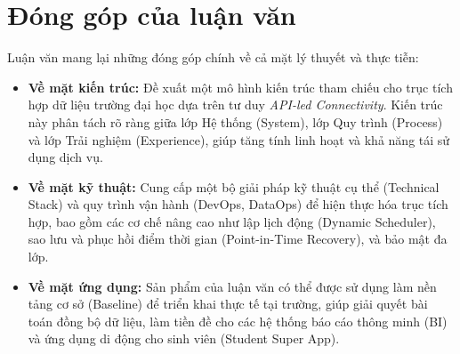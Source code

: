 \section{Đóng góp của luận văn}

Luận văn mang lại những đóng góp chính về cả mặt lý thuyết và thực tiễn:

\begin{itemize}
    \item \textbf{Về mặt kiến trúc:} Đề xuất một mô hình kiến trúc tham chiếu cho trục tích hợp dữ liệu trường đại học dựa trên tư duy \textit{API-led Connectivity}. Kiến trúc này phân tách rõ ràng giữa lớp Hệ thống (System), lớp Quy trình (Process) và lớp Trải nghiệm (Experience), giúp tăng tính linh hoạt và khả năng tái sử dụng dịch vụ.
    \item \textbf{Về mặt kỹ thuật:} Cung cấp một bộ giải pháp kỹ thuật cụ thể (Technical Stack) và quy trình vận hành (DevOps, DataOps) để hiện thực hóa trục tích hợp, bao gồm các cơ chế nâng cao như lập lịch động (Dynamic Scheduler), sao lưu và phục hồi điểm thời gian (Point-in-Time Recovery), và bảo mật đa lớp.
    \item \textbf{Về mặt ứng dụng:} Sản phẩm của luận văn có thể được sử dụng làm nền tảng cơ sở (Baseline) để triển khai thực tế tại trường, giúp giải quyết bài toán đồng bộ dữ liệu, làm tiền đề cho các hệ thống báo cáo thông minh (BI) và ứng dụng di động cho sinh viên (Student Super App).
\end{itemize}